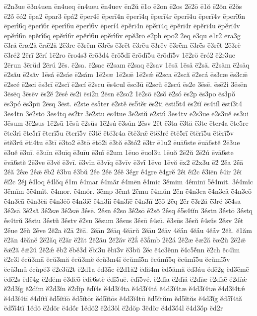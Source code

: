 {ē2n3ue
ē3n4uen
ēn4ueq
ēn4ueu
ēn4uev
ēn2ŭ
ē1o
ē2on
ē2os
2ē2ō
ē1ŏ
ē2ŏn
ē2ŏs
ē2ŏ́
ēó2
ēpa2
ēpar3
ēpá2
ēper4ē
ēperī4n
ēperī4q
ēperī4r
ēperī4u
ēperī4v
ēperī́6n
ēperī́6q
ēperī́6r
ēperī́6u
ēperī́6v
ēperí4
ēpĕrī4n
ēpĕrī4q
ēpĕrī4r
ēpĕrī4u
ēpĕrī4v
ēpĕrī́6n
ēpĕrī́6q
ēpĕrī́6r
ēpĕrī́6u
ēpĕrī́6v
ēpĕ3rō
ē2ph
ēpo2
2ēq
ē3qu
ē1r2
ēra3g
ē3ră
ēræ2ă
ērǣ2ă
2ē3re
ē3rēm
ē3rēs
ē3rēt
ē3rēu
ē3rēv
ē3rḗm
ē3rḗs
ē3rḗt
2ē3rĕ
ē3ré2
2ērī
2ērí
1ē2ro
ēro4s3
ērō3d4
ērō5dī
ērōdī5u
ērōdī5v
1ē2rŏ
ēró2
ē2r3ue
2ērun
3ērŭd
2ērú
2ēs.
ē2sa.
ē2sae
ē2sam
ē2saq
ē2sav
1ēsā
1ēsă
ē2să.
ē2săm
ē2săq
ē2său
ē2săv
1ēsá
ē2sáe
ē2sám
1ē2sæ
1ē2sǣ
1ē2sǽ
ē2sca
ē2scă
ē2scá
ēs3cæ
ēs3cǣ
ē2scé
ē2sci
ēs3cī
ē2scĭ
ē2scí
ē2scu
ēs4cul
ēsc3ū
ē2scŭ
ē2scú
ēs2e
3ēsē.
ēsē2i
3ēsēn
3ēsēq
3ēsēv
ēs2ĕ
2ēsé
ēs2i
ēsi2n
2ēsn
ē2so2
1ē2sō
ē2sŏ
ē2só
ēs2p
ēs3po
ēs3pŏ
ēs3pó
ēs3pū
2ēsq
3ēst.
ē2ste
ēs5ter
ē2stĕ
ēs5tĕr
ēs2ti
ēsti5t4
ēs2tĭ
ēs4tíl
ēstí3t4
3ēs4tn
3ē2stō
3ēs4tq
ēs2tr
3ē2stu
ēs4tue
3ē2stŭ
ē2stú
3ēs4tv
ē2s3ue
ē2s3uĕ
ēs3ui
3ēsum
3ē2sus
1ē2sū
1ēsŭ
ē2sŭs
1ē2sú
ē3sún
2ēsv
2ēt
ē3ta
ē3tă
ē3te
ēter4a
ēte5re
ēte3ri
ēte5rī
ēterī5u
ēterī5v
ē3tĕ
ētĕ3r4a
ētĕ3rǣ
ētĕ3rĕ
ētĕ5rī
ētĕrī5u
ētĕrī5v
ētĕ3rŭ
ēti4tu
ē3tī
ē3to2
ē3tō
ētō2i
ē3tŏ
ē3tó2
ē3tr
ē1u2
ēuā6ste
ēuā6stĕ
2ē3ue
ē3uĕ
ē3uī.
ē3uīn
ē3uīq
ē3uīu
ē3uī́
ē2um
1ēuo
ēuol3u
1ēuŏ
2ē2ŭ
2ē2ú
ēvā6ste
ēvā6stĕ
2ē3ve
ē3vĕ
ē3vī.
ē3vīn
ē3vīq
ē3vīv
ē3vī́
1ēvo
1ēvŏ
ēx2
ē2x3u
ē2́
2ḗa
2ḗā
2ḗă
2ḗæ
2ḗǣ
ḗb2
ḗ3bu
ḗ3bŭ
2ḗe
2ḗē
2ḗĕ
3ḗgr
ḗ4gre
ḗ4grĕ
2ḗi
ḗi2c
ḗ3iēn
ḗ4ir
2ḗī
ḗĭ2c
2ḗj
ḗ4loq
ḗ4lŏq
ḗ1m
ḗ4mar
ḗ4măr
ḗ4mēn
ḗ4mic
3ḗmim
4ḗminī
5ḗ4mit.
3ḗ4mĭc
3ḗmĭm
5ḗ4mĭt.
ḗ4mor.
ḗ4mŏr.
3ḗmp
3ḗmt
2ḗmu
ḗ4mŭn
2ḗn
ḗ4n3ea
ḗ4n3eā
ḗ4n3eō
ḗ4n3ĕā
ḗ4n3ĕă
ḗ4n3ĕō
ḗ4n3iē
ḗ4n3ii
ḗ4n3ĭē
ḗ4n3ĭĭ
2ḗō
2ḗq
2ḗr
ḗ3r2ă
ḗ3rĕ
3ḗ4sa
3ḗ2sā
3ḗ2să
3ḗ2sæ
3ḗ2sǣ
3ḗsē.
2ḗsn
ḗ2so
3ḗ2sō
ḗ2sŏ
2ḗsq
ḗ5s4tĭn
3ḗstn
3ḗstō
3ḗstq
ḗs4trŭ
3ḗstu
3ḗstŭ
3ḗstv
ḗ2su
3ḗsum
3ḗsus
3ḗsū
ḗ4sū.
ḗ3sūs
3ḗsŭ
ḗ4sŭs
2ḗsv
2ḗt
2ḗue
2ḗŭ
2ḗve
2ĕ2a
ĕ2ā
2ĕā.
2ĕān
2ĕāq
4ĕārŭ
2ĕāu
2ĕāv
4ĕā́n
4ĕā́u
4ĕā́v
2ĕă.
ĕ1ăm
ĕ2ăn
4ĕănĕ
2ĕ2ăq
ĕ2ăr
ĕ2ăt
2ĕ2ău
2ĕ2ăv
ĕ2ắ
ĕ3ắmb
2ĕ2á
2ĕ2æ
ĕæ2ă
ĕæ2ŭ
2ĕ2ǣ
ĕǣ2ă
ĕǣ2ŭ
2ĕ2ǽ
ĕb2
ĕbĕ3d
ĕbī3u
ĕbī3v
ĕ3bŭ
2ĕc
ĕ4c3ĕnn
ĕ4c5ĕ́nn
ĕ2ch
ĕc4ĭm
ĕ2c3l
ĕcŭ3mā
ĕcŭ3mă
ĕcŭ3mĕ
ĕcŭ3m4ī
ĕcŭmī́5n
ĕcŭmī́5q
ĕcŭmī́5u
ĕcŭmī́5v
ĕcŭ3mŭ
ĕcŭpĕ3
ĕ2c3ŭ2t
ĕ2d1a
ĕd3ā́c
ĕ2d1ă2
ĕdă4m
ĕd5ămă
ĕd3áu
ĕdē2g
ĕd3ēmē
ĕdē2s
ĕdḗ4g
ĕ2dĕm
ĕ3dĕō
ĕdĕ6stĕ
ĕdī5uĕ.
ĕdī5vĕ.
ĕ2dĭa
ĕ2dĭá
ĕ2dĭæ
ĕ2dĭǣ
ĕ2dĭǽ
ĕ2d3ĭg
ĕ2dĭm
ĕ2d3ĭn
ĕ2dĭp
ĕdĭ4s
ĕ4d3ĭ4ta
ĕ4d3ĭ4tá
ĕ4d3ĭ4tæ
ĕ4d3ĭ4tǣ
ĕ4d3ĭ4tǽ
ĕ4d3ĭ4tī
ĕ4dĭtĭ
ĕd5ĭtĭō
ĕd5ĭtōr
ĕd5ĭtōs
ĕ4d3ĭ4tū
ĕd5ĭtŭm
ĕd5ĭtŭs
ĕ4d3ĭ́g
ĕd5ĭ́4tă
ĕd5ĭ́4tĭ
1ĕdō
ĕ2dōr
ĕ4dṓr
1ĕdŏ2
ĕ2d3ŏl
ĕ2dŏp
3ĕdŏr
ĕ4d3ŏ́4l
ĕ4d3ŏ́p
ĕd2r
}
